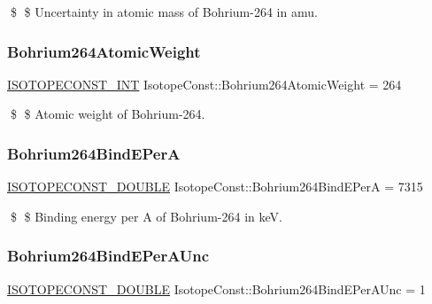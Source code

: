 \$ \$ Uncertainty in atomic mass of Bohrium-\/264 in amu. \mbox{\label{group___isotope_const-_bohrium-_bh264_ga1a2169775dbad85f95473773f2a0decd}} 
\subsubsection{\texorpdfstring{Bohrium264\+Atomic\+Weight}{Bohrium264AtomicWeight}}
{\footnotesize\ttfamily \mbox{\hyperlink{group___isotope_const-_macros_ga5f18360b3e99483a35c32d789e62621c}{I\+S\+O\+T\+O\+P\+E\+C\+O\+N\+S\+T\+\_\+\+I\+NT}} Isotope\+Const\+::\+Bohrium264\+Atomic\+Weight = 264}

\$ \$ Atomic weight of Bohrium-\/264. \mbox{\label{group___isotope_const-_bohrium-_bh264_ga6237c62d35afa93b28a9677b69a4cbef}} 
\subsubsection{\texorpdfstring{Bohrium264\+Bind\+E\+PerA}{Bohrium264BindEPerA}}
{\footnotesize\ttfamily \mbox{\hyperlink{group___isotope_const-_macros_ga8f45a7272ce02c0b4c65c44636ed719a}{I\+S\+O\+T\+O\+P\+E\+C\+O\+N\+S\+T\+\_\+\+D\+O\+U\+B\+LE}} Isotope\+Const\+::\+Bohrium264\+Bind\+E\+PerA = 7315}

\$ \$ Binding energy per A of Bohrium-\/264 in keV. \mbox{\label{group___isotope_const-_bohrium-_bh264_ga00219cf01596cdb46f6ae52f755697e6}} 
\subsubsection{\texorpdfstring{Bohrium264\+Bind\+E\+Per\+A\+Unc}{Bohrium264BindEPerAUnc}}
{\footnotesize\ttfamily \mbox{\hyperlink{group___isotope_const-_macros_ga8f45a7272ce02c0b4c65c44636ed719a}{I\+S\+O\+T\+O\+P\+E\+C\+O\+N\+S\+T\+\_\+\+D\+O\+U\+B\+LE}} Isotope\+Const\+::\+Bohrium264\+Bind\+E\+Per\+A\+Unc = 1}

